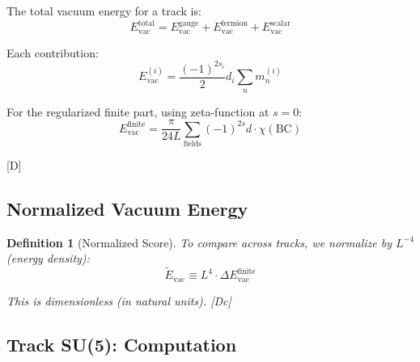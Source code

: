 \documentclass[11pt,a4paper]{article}
\newtheorem{definition}[theorem]{Definition}
\newcommand{\tagD}{\textcolor{blue!70!black}{[D]}}
\newcommand{\tagDc}{\textcolor{blue!50!black}{[Dc]}}
\begin{document}
The total vacuum energy for a track is:
\begin{equation}
\label{eq:vac-total}
E_{\text{vac}}^{\text{total}} = E_{\text{vac}}^{\text{gauge}} + E_{\text{vac}}^{\text{fermion}}
+ E_{\text{vac}}^{\text{scalar}}
\end{equation}

Each contribution:
\begin{equation}
\label{eq:vac-contrib}
E_{\text{vac}}^{(i)} = \frac{(-1)^{2s_i}}{2} d_i \sum_n m_n^{(i)}
\end{equation}

For the regularized finite part, using zeta-function at $s = 0$:
\begin{equation}
\label{eq:vac-finite-formula}
E_{\text{vac}}^{\text{finite}} = \frac{\pi}{24L} \sum_{\text{fields}} (-1)^{2s} d \cdot \chi(\text{BC})
\end{equation}

\tagD

\subsection{Normalized Vacuum Energy}

\begin{definition}[Normalized Score]
\label{def:norm-score}
To compare across tracks, we normalize by $L^{-4}$ (energy density):
\begin{equation}
\label{eq:norm-score}
\tilde{E}_{\text{vac}} \equiv L^4 \cdot \Delta E_{\text{vac}}^{\text{finite}}
\end{equation}

This is dimensionless (in natural units). \tagDc
\end{definition}

\subsection{Track SU(5): Computation}
\end{document}
